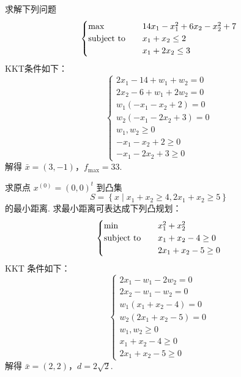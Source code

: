 \begin{problem}[P243 6]
    求解下列问题
    \[\begin{cases}
        \max \quad &14x_1 - x_1^2 + 6x_2 - x_2^2 + 7\\
        \operatorname{subject\ to} \quad &x_1 + x_2 \le 2\\
        &x_1 + 2x_2 \le 3
    \end{cases}\]
    \Answer KKT条件如下：\[\begin{cases}
        2 x_{1}-14+w_{1}+w_{2}=0 \\
        2 x_{2}-6+w_{1}+2 w_{2}=0 \\
        w_{1}\left(-x_{1}-x_{2}+2\right)=0 \\
        w_{2}\left(-x_{1}-2 x_{2}+3\right)=0 \\
        w_{1}, w_{2} \geqslant 0 \\
        -x_{1}-x_{2}+2 \geqslant 0 \\
        -x_{1}-2 x_{2}+3 \geqslant 0
    \end{cases}\]解得 $\bar{x} = (3, -1)$，$f_{\max} = 33$.
\end{problem}

\begin{problem}[P243 7]
    求原点 $x^{(0)} = (0, 0)^t$ 到凸集 \[S = \left\{x \mid x_1 + x_2 \ge 4, 2x_1 + x_2 \ge 5\right\}\] 的最小距离.
    \Answer 求最小距离可表达成下列凸规划：\[\begin{cases}
        \min \quad &x_1^2 + x_2^2\\
        \operatorname{subject\ to} \quad &x_1 + x_2 - 4 \ge 0\\
        &2x_1 + x_2 - 5 \ge 0
    \end{cases}\]
    KKT 条件如下：\[\begin{cases}
        2 x_{1}-w_{1}-2 w_{2}=0 \\
        2 x_{2}-w_{1}-w_{2}=0 \\
        w_{1}\left(x_{1}+x_{2}-4\right)=0 \\
        w_{2}\left(2 x_{1}+x_{2}-5\right)=0 \\
        w_{1}, w_{2} \geqslant 0 \\
        x_{1}+x_{2}-4 \geqslant 0 \\
        2 x_{1}+x_{2}-5 \geqslant 0
    \end{cases}\]
    解得 $\bar{x} = (2, 2)$，$d = 2\sqrt{2}$.
\end{problem}

